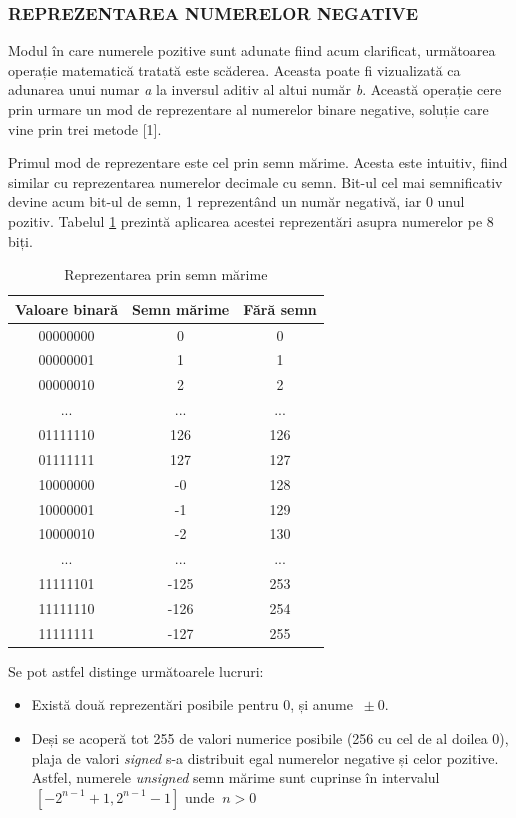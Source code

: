 \documentclass[12pt]{article}
\begin{document}
\subsubsection{REPREZENTAREA NUMERELOR NEGATIVE}
Modul în care numerele pozitive sunt adunate fiind acum clarificat, următoarea operație matematică tratată este scăderea. Aceasta poate fi vizualizată ca adunarea unui numar \textit{a} la inversul aditiv al altui număr \textit{b}.
Această operație cere prin urmare un mod de reprezentare al numerelor binare negative, soluție care vine prin trei metode [1].

Primul mod de reprezentare este cel prin semn mărime. Acesta este intuitiv, fiind similar cu reprezentarea numerelor decimale cu semn. Bit-ul cel mai semnificativ devine acum bit-ul de semn, 1 reprezentând un număr negativă, iar 0 unul pozitiv. Tabelul \ref{Tabela:5} prezintă aplicarea acestei reprezentări asupra numerelor pe 8 biți.

\begin{table}[h]
\centering
\begin{tabular}{ ||c|c|c|| }
 \hline
 Valoare binară & Semn mărime &  Fără semn\\ 
 \hline  \hline
 00000000 & 0 & 0\\
 \hline
 00000001 & 1  & 1\\
 \hline
 00000010 &  2 & 2 \\
 \hline
  ... &  ... & ... \\
 \hline
 01111110 & 126 & 126 \\
 \hline
 01111111 & 127 & 127 \\
 \hline
 10000000 & -0 & 128 \\
 \hline
 10000001 & -1 & 129 \\
 \hline
 10000010 & -2 & 130 \\
 \hline
   ... &  ... & ... \\
 \hline
  11111101 & -125 & 253 \\
 \hline
 11111110 & -126 & 254 \\
 \hline
 11111111 & -127 & 255 \\
 \hline
\end{tabular}
\caption{Reprezentarea prin semn mărime }
\label{Tabela:5}
\end{table}
Se pot astfel distinge următoarele lucruri:
\begin{itemize}
\item Există două reprezentări posibile pentru 0, și anume $\ \pm 0$.
\item Deși se acoperă tot 255 de valori numerice posibile (256 cu cel de al doilea 0), plaja de valori \textit{signed} s-a distribuit egal numerelor negative și celor pozitive. Astfel, numerele \textit{unsigned} semn mărime sunt cuprinse în intervalul $\ [-2^{n-1}+1, 2^{n-1}-1]$ unde $\ n > 0$ 
\end{itemize}
\end{document}
